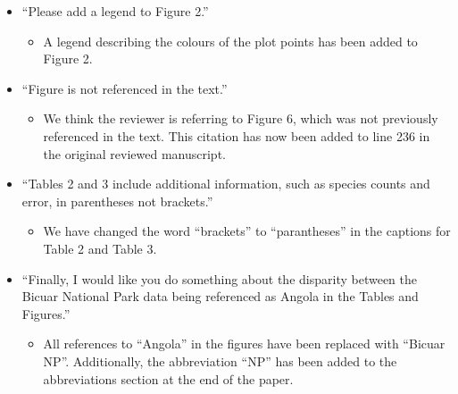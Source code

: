 \documentclass[a4paper]{letter}
\begin{document}
\begin{letter}{}
\begin{itemize}
\begin{itemize}
		\end{itemize}
	\item{``Please add a legend to Figure 2.''}
		\begin{itemize}
			\item{A legend describing the colours of the plot points has been added to Figure 2.}
		\end{itemize}
	\item{``Figure is not referenced in the text.''}
		\begin{itemize}
			\item{We think the reviewer is referring to Figure 6, which was not previously referenced in the text. This citation has now been added to line 236 in the original reviewed manuscript.}
		\end{itemize}
	\item{``Tables 2 and 3 include additional information, such as species counts and error, in parentheses not brackets.''}
		\begin{itemize}
			\item{We have changed the word ``brackets'' to ``parantheses'' in the captions for Table 2 and Table 3.}
		\end{itemize}
	\item{``Finally, I would like you do something about the disparity between the Bicuar National Park data being referenced as Angola in the Tables and Figures.''}
		\begin{itemize}
			\item{All references to ``Angola'' in the figures have been replaced with ``Bicuar NP''. Additionally, the abbreviation ``NP'' has been added to the abbreviations section at the end of the paper.}
		\end{itemize}
\end{itemize}






\end{letter}
 
\end{document}
